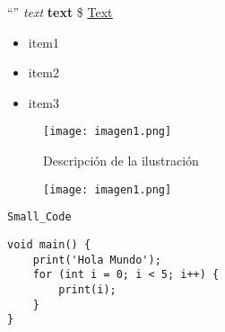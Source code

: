 
“”                                         %
\textit {text}                             %
\textbf{text}                              %
\$                                         %
\href{url}{\color{blue}\underline{Text}}   %
\begin{itemize}
    \item item1
    
    \item item2
    
    \item item3
\end{itemize}

\begin{figure}[H]
    \centering
    \texttt{[image: imagen1.png]}
    \caption{Descripción de la ilustración}
    \label{fig:reference}
\end{figure}


\begin{figure}[H]
    \centering
    \texttt{[image: imagen1.png]}
\end{figure}


\parencite{Name_Of_The_Author}


\lstinline{Small_Code}


\begin{center}
\begin{lstlisting}
void main() {
    print('Hola Mundo');
    for (int i = 0; i < 5; i++) {
        print(i);
    }
}
\end{lstlisting}
\end{center}
